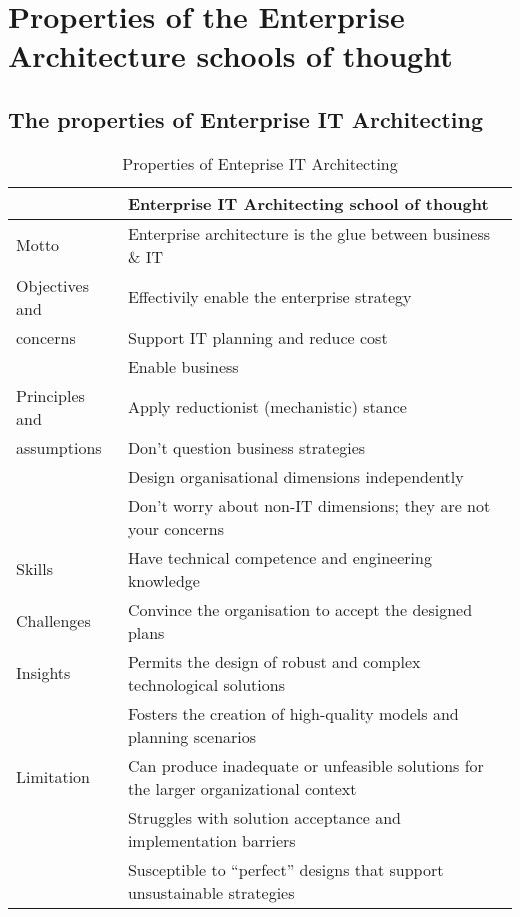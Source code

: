 \chapter{Properties of the Enterprise Architecture schools of thought}
\label{app:easchoolsproperties}
\section{The properties of Enterprise IT Architecting}
\begin{small}
\begin{longtable}{p{}p{}}
	\toprule
	& \textbf{Enterprise IT Architecting school of thought} \\ \midrule%
	\endhead%
	\hline
	\caption{Properties of Enteprise IT Architecting \parencite[p. 39]{Lapalme2012}}
	\label{tab:enterpriseitarchitecting}	
	\endfoot%
	Motto    		& Enterprise architecture is the glue between business \& IT \\
	Objectives and 	& Effectivily enable the enterprise strategy \\
	concerns		& Support IT planning and reduce cost \\
					& Enable business \\
	Principles and  & Apply reductionist (mechanistic) stance \\
	assumptions		& Don't question business strategies  \\
					& Design organisational dimensions independently \\
					& Don't worry about non-IT dimensions; they are not your concerns \\
	Skills 			& Have technical competence and engineering knowledge \\
	Challenges		& Convince the organisation to accept the designed plans \\
	Insights		& Permits the design of robust and complex technological solutions \\
					& Fosters the creation of high-quality models and planning scenarios \\
	Limitation		& Can produce inadequate or unfeasible solutions for the larger organizational context \\
					& Struggles with solution acceptance and implementation barriers \\
					& Susceptible to “perfect” designs 	that support unsustainable strategies \\
	\bottomrule
\end{longtable}
\end{small}
\newpage
